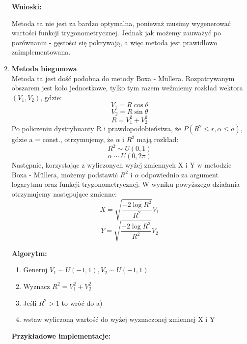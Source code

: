 \documentclass{article}
\begin{document}
\begin{enumerate}
		\textbf{Wnioski:}
		
		Metoda ta nie jest za bardzo optymalna, ponieważ musimy wygenerować wartości funkcji trygonometrycznej. Jednak jak możemy zauważyć po porównaniu - gęstości się pokrywają, a więc metoda jest prawidłowo zaimplementowana.
		
		\item\textbf{Metoda biegunowa}\\
		
		Metoda ta jest dość podobna do metody Boxa - M\"{u}llera. Rozpatrywanym obszarem jest koło jednostkowe, tylko tym razem weźmiemy rozkład wektora $(V_{1}, V_{2})$, gdzie:
		$$V_{1} = R\cos{\theta}$$
		$$V_{2} = R\sin{\theta}$$
		$$R = V_{1}^2 + V_{2}^2$$
		Po policzeniu dystrybuanty R i prawdopodobieństwa, że $P(R^2 \le r, \alpha \le a)$, gdzie a = const., otrzymujemy, że $\alpha$ i $R^2$ mają rozkład:
		$$R^2\sim U(0,1)$$
		$$\alpha \sim U(0,2\pi)$$
		Następnie, korzystając z wyliczonych wyżej zmiennych X i Y w metodzie Boxa - M\"{u}llera, możemy podstawić $R^2$ i $\alpha$ odpowiednio za argument logarytmu oraz funkcji trygonometrycznej. W wyniku powyższego działania otrzymujemy następujące zmienne:
		$$X = \sqrt{\frac{-2\log{R^2}}{R^2}}V_{1}$$
		$$Y = \sqrt{\frac{-2\log{R^2}}{R^2}}V_{2}$$
		
		\textbf{Algorytm:}
		\begin{enumerate}
			\item Generuj $V_{1}\sim U(-1,1),V_{2}\sim U(-1,1)$ 
			\item Wyznacz $R^2 = V_{1}^2 + V_{2}^2$
			\item Jeśli $R^2 > 1$ to wróć do a)
			\item wstaw wyliczoną wartość do wyżej wyznaczonej zmiennej X i Y
		\end{enumerate}
		\textbf{Przykładowe implementacje:}
		

\end{enumerate}
\end{document}
